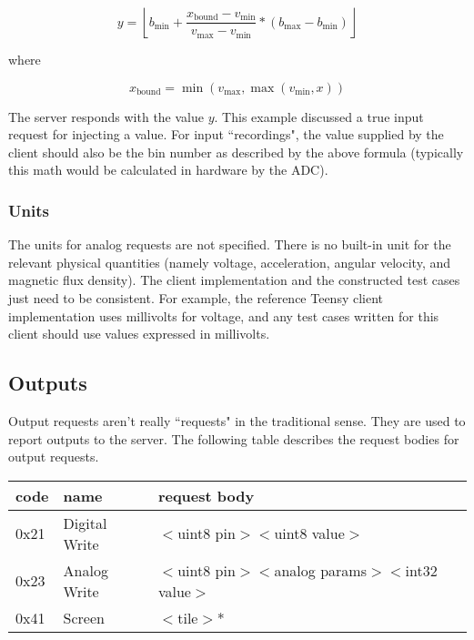 \documentclass[12pt]{article}
\begin{document}
$$y = \left \lfloor b_{\text{min}} + \frac{x_{\text{bound}}-v_{\text{min}}}{v_{\text{max}}-v_{\text{min}}} * (b_{\text{max}}-b_{\text{min}}) \right \rfloor$$

where

$$x_{\text{bound}} = \min(v_{\text{max}}, \max(v_{\text{min}}, x))$$

The server responds with the value $y$.  This example discussed a true input request for injecting a value.  For input ``recordings", the value supplied by the client should also be the bin number as described by the above formula (typically this math would be calculated in hardware by the ADC).

\subsubsection{Units}
The units for analog requests are not specified.  There is no built-in unit for the relevant physical quantities (namely voltage, acceleration, angular velocity, and magnetic flux density).  The client implementation and the constructed test cases just need to be consistent.  For example, the reference Teensy client implementation uses millivolts for voltage, and any test cases written for this client should use values expressed in millivolts.

\subsection{Outputs}
Output requests aren't really ``requests" in the traditional sense.  They are used to report outputs to the server.  The following table describes the request bodies for output requests.

\begin{center}
\begin{tabular}{l l l}
code & name & request body \\ \hline
0x21 & Digital Write & $<$uint8 pin$>$$<$uint8 value$>$ \\
0x23 & Analog Write & $<$uint8 pin$>$$<$analog params$>$$<$int32 value$>$ \\
0x41 & Screen & $<$tile$>$* \\
\end{tabular}
\end{center}

\vspace{5mm}
\end{document}
